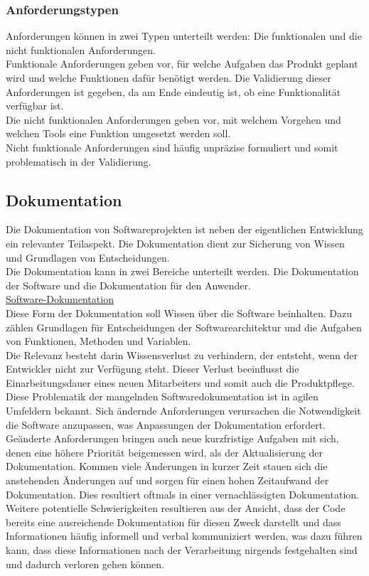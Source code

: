 \documentclass[12pt,a4paper]{article}
\begin{document}
\subsubsection{Anforderungstypen}
\label{Anforderungstypen}
Anforderungen können in zwei Typen unterteilt werden: Die funktionalen und die nicht funktionalen Anforderungen.
\\Funktionale Anforderungen geben vor, für welche Aufgaben das Produkt geplant wird und welche Funktionen dafür benötigt werden. Die Validierung dieser Anforderungen ist gegeben, da am Ende eindeutig ist, ob eine Funktionalität verfügbar ist. \\
Die nicht funktionalen Anforderungen geben vor, mit welchem Vorgehen und welchen Tools eine Funktion umgesetzt werden soll\cite{10.1145/2884781.2884788}. \\
Nicht funktionale Anforderungen sind häufig unpräzise formuliert und somit problematisch in der Validierung\cite{10.1145/2884781.2884788}.
\subsection{Dokumentation}
\label{Dokumenation}
Die Dokumentation von Softwareprojekten ist neben der eigentlichen Entwicklung ein relevanter Teilaspekt. Die Dokumentation dient zur Sicherung von Wissen und Grundlagen von Entscheidungen. \\
Die Dokumentation kann in zwei Bereiche unterteilt werden. Die Dokumentation der Software und die Dokumentation für den Anwender\cite{THEUNISSEN2022106733}.\\
\underline{Software-Dokumentation}\\
Diese Form der Dokumentation soll Wissen über die Software beinhalten. Dazu zählen Grundlagen für Entscheidungen der Softwarearchitektur und die Aufgaben von Funktionen, Methoden und Variablen.\\
Die Relevanz besteht darin Wissensverlust zu verhindern, der entsteht, wenn der Entwickler nicht zur Verfügung steht. Dieser Verlust beeinflusst die Einarbeitungsdauer eines neuen Mitarbeiters und somit auch die Produktpflege. \\
Diese Problematik der mangelnden Softwaredokumentation ist in agilen Umfeldern bekannt. Sich ändernde Anforderungen verursachen die Notwendigkeit die Software anzupassen, was Anpassungen der Dokumentation erfordert. Geänderte Anforderungen bringen auch neue kurzfristige Aufgaben mit sich, denen eine höhere Priorität beigemessen wird, als der Aktualisierung der Dokumentation. Kommen viele Änderungen in kurzer Zeit stauen sich die anstehenden Änderungen auf und sorgen für einen hohen Zeitaufwand der Dokumentation. Dies resultiert oftmals in einer vernachlässigten Dokumentation.\\
Weitere potentielle Schwierigkeiten resultieren aus der Ansicht, dass der Code bereits eine ausreichende Dokumentation für diesen Zweck darstellt und dass Informationen häufig informell und verbal kommuniziert werden, was dazu führen kann, dass diese Informationen nach der Verarbeitung nirgends festgehalten sind und dadurch verloren gehen können\cite{THEUNISSEN2022106733}.\\
\end{document}
